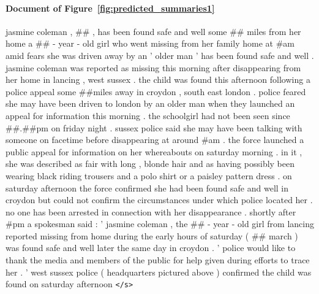 \documentclass[12pt]{report}
\begin{document}
\begin{appendices}
\paragraph{Document of Figure~\ref{fig:predicted_summaries1}} jasmine coleman , \#\# , has been found safe and well some \#\# miles from her home a \#\# - year - old girl who went missing from her family home at \#am amid fears she was driven away by an ' older man ' has been found safe and well . jasmine coleman was reported as missing this morning after disappearing from her home in lancing , west sussex . the child was found this afternoon following a police appeal some \#\#miles away in croydon , south east london . police feared she may have been driven to london by an older man when they launched an appeal for information this morning . the schoolgirl had not been seen since \#\#.\#\#pm on friday night . sussex police said she may have been talking with someone on facetime before disappearing at around \#am . the force launched a public appeal for information on her whereabouts on saturday morning . in it , she was described as fair with long , blonde hair and as having possibly been wearing black riding trousers and a polo shirt or a paisley pattern dress . on saturday afternoon the force confirmed she had been found safe and well in croydon but could not confirm the circumstances under which police located her . no one has been arrested in connection with her disappearance . shortly after \#pm a spokesman said : ' jasmine coleman , the \#\# - year - old girl from lancing reported missing from home during the early hours of saturday ( \#\# march ) was found safe and well later the same day in croydon . ' police would like to thank the media and members of the public for help given during efforts to trace her . ' west sussex police ( headquarters pictured above ) confirmed the child was found on saturday afternoon \texttt{</s>}


\end{appendices}
\end{document}
